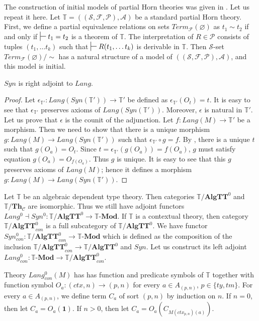 \documentclass[reqno]{amsart}
\theoremstyle{definition}
\theoremstyle{remark}
\newcommand{\cat}[1]{\mathbf{#1}}
\newcommand{\Mod}[1]{#1\text{-}\cat{Mod}}
\newcommand{\Th}{\cat{Th}}
\newcommand{\algtt}{\cat{AlgTT}}
\newcommand{\ThC}{\Th_{\mathcal{C}}}
\newcommand{\emptyCtx}{\mathbf{1}}
\numberwithin{figure}{section}
\begin{document}
The construction of initial models of partial Horn theories was given in \cite{PHL}.
Let us repeat it here.
Let $\mathbb{T} = ((\mathcal{S},\mathcal{F},\mathcal{P}),\mathcal{A})$ be a standard partial Horn theory.
First, we define a partial equivalence relations on sets $Term_\mathcal{F}(\varnothing)$ as $t_1 \sim t_2$ if and only if $\sststile{}{} t_1 = t_2$ is a theorem of $\mathbb{T}$.
The interpretation of $R \in \mathcal{P}$ consists of tuples $(t_1, \ldots t_k)$ such that $\sststile{}{} R(t_1, \ldots t_k)$ is derivable in $\mathbb{T}$.
Then $\mathcal{S}$-set $Term_\mathcal{F}(\varnothing)/\!\sim$ has a natural structure of a model of $((\mathcal{S},\mathcal{F},\mathcal{P}),\mathcal{A})$, and this model is initial.

\begin{prop}
$Syn$ is right adjoint to $Lang$.
\end{prop}
\begin{proof}
Let $\epsilon_{\mathbb{T}'} : Lang(Syn(\mathbb{T}')) \to \mathbb{T}'$ be defined as $\epsilon_{\mathbb{T}'}(O_t) = t$.
It is easy to see that $\epsilon_{\mathbb{T}'}$ preserves axioms of $Lang(Syn(\mathbb{T}'))$.
Moreover, $\epsilon$ is natural in $\mathbb{T}'$.
Let us prove that $\epsilon$ is the counit of the adjunction.
Let $f : Lang(M) \to \mathbb{T}'$ be a morphism.
Then we need to show that there is a unique morphism $g : Lang(M) \to Lang(Syn(\mathbb{T}'))$ such that $\epsilon_{\mathbb{T}'} \circ g = f$.
By , there is a unique $t$ such that $g(O_a) = O_t$.
Since $t = \epsilon_{\mathbb{T}'}(g(O_a)) = f(O_a)$, $g$ must satisfy equation $g(O_a) = O_{f(O_a)}$.
Thus $g$ is unique.
It is easy to see that this $g$ preserves axioms of $Lang(M)$; hence it defines a morphism $g : Lang(M) \to Lang(Syn(\mathbb{T}'))$.
\end{proof}

Let $\mathbb{T}$ be an algebraic dependent type theory.
Then categories $\mathbb{T}/\algtt^0$ and $\mathbb{T}/\ThC$ are isomorphic.
Thus we still have adjoint functors $Lang^0 \dashv Syn^0 : \mathbb{T}/\algtt^0 \to \Mod{\mathbb{T}}$.
If $\mathbb{T}$ is a contextual theory, then category $\mathbb{T}/\algtt^0_{con}$ is a full subcategory of $\mathbb{T}/\algtt^0$.
We have functor $Syn^0_{con} : \mathbb{T}/\algtt^0_{con} \to \Mod{\mathbb{T}}$ which is defined as the composition of the inclusion $\mathbb{T}/\algtt^0_{con} \to \mathbb{T}/\algtt^0$ and $Syn$.
Let us construct its left adjoint $Lang^0_{con} : \Mod{\mathbb{T}} \to \mathbb{T}/\algtt^0_{con}$.

Theory $Lang^0_{con}(M)$ has has function and predicate symbols of $\mathbb{T}$ together with function symbol $O_a : (ctx,n) \to (p,n)$ for every $a \in A_{(p,n)}$, $p \in \{ ty, tm \}$.
For every $a \in A_{(p,n)}$, we define term $C_a$ of sort $(p,n)$ by induction on $n$.
If $n = 0$, then let $C_a = O_a(\emptyCtx)$.
If $n > 0$, then let $C_a = O_a(C_{M(ctx_{p,n})(a)})$.
\end{document}
